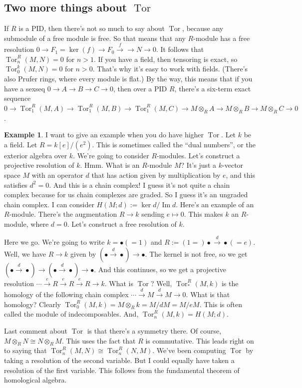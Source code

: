 \documentclass{amsart}
\theoremstyle{theorem}
\theoremstyle{definition}
\newtheorem{example}[theorem]{Example}
\DeclareMathOperator{\img}{Im}
\DeclareMathOperator{\Tor}{Tor}
\begin{document}
\subsection{Two more things about $\Tor$}
If $R$ is a PID, then there's not so much to say about $\Tor$, because any submodule of a free module is free. So that means that any $R$-module has a free resolution $0\to F_1=\ker(f)\to F_0\xrightarrow{f}\to N\to 0$. It follows that $\Tor^R_n(M,N)=0$ for $n>1$. If you have a field, then tensoring is exact, so $\Tor^k_0(M,N)=0$ for $n>0$. That's why it's easy to work with fields. (There's also Prufer rings, where every module is flat.) By the way, this means that if you have a sexseq $0\to A\to B\to C\to 0$, then over a PID $R$, there's a six-term exact sequence $0\to\Tor^R_1(M,A)\to \Tor^R_1(M,B)\to \Tor^R_1(M,C)\to M\otimes_R A\to M\otimes_R B\to M\otimes_R C\to 0$.
\begin{example}
I want to give an example when you do have higher $\Tor$. Let $k$ be a field. Let $R=k[e]/(e^2)$. This is sometimes called the ``dual numbers'', or the exterior algebra over $k$. We're going to consider $R$-modules. Let's construct a projective resolution of $k$. Hmm. What is an $R$-module $M$? It's just a $k$-vector space $M$ with an operator $d$ that has action given by multiplication by $e$, and this satisfies $d^2=0$. And this is a chain complex! I guess it's not quite a chain complex because for us chain complexes are graded. So I guess it's an ungraded chain complex. I can consider $ H(M;d):=\ker d/\img d$. Here's an example of an $R$-module. There's the augmentation $R\to k$ sending $e\mapsto 0$. This makes $k$ an $R$-module, where $d=0$. Let's construct a free resolution of $k$.

Here we go. We're going to write $k=\bullet(=1)$ and $R:=(1=)\bullet\xrightarrow{d}\bullet(=e)$. Well, we have $R\to k$ given by $(\bullet\xrightarrow{d}\bullet)\to \bullet$. The kernel is not free, so we get $(\bullet\xrightarrow{d}\bullet)\to (\bullet\xrightarrow{d}\bullet)\to \bullet$. And this continues, so we get a projective resolution $\cdots\xrightarrow{e} R\xrightarrow{e} R\xrightarrow{e} R\to k$. What is $\Tor$? Well, $\Tor^R_\ast(M,k)$ is the homology of the following chain complex $\cdots\xrightarrow{d} M\xrightarrow{d} M\to 0$. What is that homology? Clearly $\Tor^R_0(M,k)=M\otimes_R k=M/dM=M/eM$. This is often called the module of indecomposables. And, $\Tor^R_n(M,k)= H(M;d)$.
\end{example}
Last comment about $\Tor$ is that there's a symmetry there. Of course, $M\otimes_R N\cong N\otimes_R M$. This uses the fact that $R$ is commutative. This leads right on to saying that $\Tor^R_n(M,N)\cong \Tor^R_n(N,M)$. We've been computing $\Tor$ by taking a resolution of the second variable. But I could equally have taken a resolution of the first variable. This follows from the fundamental theorem of homological algebra.
\end{document}
